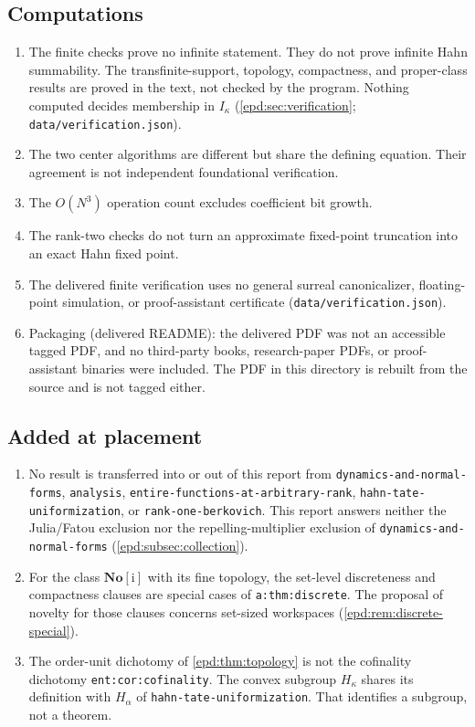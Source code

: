 \documentclass[11pt,a4paper]{article}
\numberwithin{equation}{section}
\theoremstyle{plain}
\theoremstyle{definition}
\theoremstyle{remark}
\newcommand{\No}{\mathbf{No}}
\newcommand{\Ik}{I_\kappa}
\begin{document}
\subsection*{Computations}
\begin{enumerate}[label=\textbf{S\arabic*.},leftmargin=2.8em,resume]
\item The finite checks prove no infinite statement. They do not prove
infinite Hahn summability. The transfinite-support, topology,
compactness, and proper-class results are proved in the text, not checked
by the program. Nothing computed decides membership in $\Ik$
(\cref{epd:sec:verification}; \texttt{data/verification.json}).
\item The two center algorithms are different but share the defining
equation. Their agreement is not independent foundational verification.
\item The $O(N^3)$ operation count excludes coefficient bit growth.
\item The rank-two checks do not turn an approximate fixed-point
truncation into an exact Hahn fixed point.
\item The delivered finite verification uses no general surreal canonicalizer,
floating-point simulation, or proof-assistant certificate (\texttt{data/verification.json}).
\item Packaging (delivered README): the delivered PDF was not an accessible
tagged PDF, and no third-party books, research-paper PDFs, or
proof-assistant binaries were included. The PDF in this directory is
rebuilt from the source and is not tagged either.
\end{enumerate}

\subsection*{Added at placement}
\begin{enumerate}[label=\textbf{P\arabic*.},leftmargin=2.8em]
\item No result is transferred into or out of this report from
\texttt{dynamics-and-\allowbreak normal-forms}, \texttt{analysis},
\texttt{entire-functions-\allowbreak at-arbitrary-rank},
\texttt{hahn-tate-\allowbreak uniformization}, or \texttt{rank-one-\allowbreak berkovich}. This report
answers neither the Julia/Fatou exclusion nor the repelling-multiplier
exclusion of \texttt{dynamics-and-\allowbreak normal-forms}
(\cref{epd:subsec:collection}).
\item For the class $\No[\mathrm i]$ with its fine topology, the set-level
discreteness and compactness clauses are special cases of
\texttt{a:thm:discrete}. The proposal of novelty for those clauses concerns
set-sized workspaces (\cref{epd:rem:discrete-special}).
\item The order-unit dichotomy of \cref{epd:thm:topology} is not the
cofinality dichotomy \texttt{ent:\allowbreak cor:cofinality}. The convex
subgroup $H_\kappa$ shares its definition with $H_\alpha$ of
\texttt{hahn-tate-\allowbreak uniformization}. That identifies a
subgroup, not a theorem.
\end{enumerate}
\end{document}
